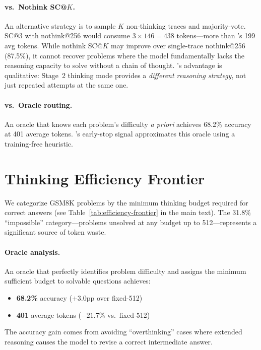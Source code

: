 \paragraph{vs.\ Nothink SC@$K$.}
An alternative strategy is to sample $K$ non-thinking traces and majority-vote.
SC@3 with nothink@256 would consume $3 \times 146 = 438$ tokens---more than
\method{}'s 199 avg tokens.
While nothink SC@$K$ may improve over single-trace nothink@256 (87.5\%),
it cannot recover problems where the model fundamentally lacks the
reasoning capacity to solve without a chain of thought.
\method{}'s advantage is qualitative: Stage~2 thinking mode provides a
\emph{different reasoning strategy}, not just repeated attempts at the same one.

\paragraph{vs.\ Oracle routing.}
An oracle that knows each problem's difficulty \emph{a priori}
achieves 68.2\% accuracy at 401 average tokens.
\method{}'s early-stop signal approximates this oracle using a training-free heuristic.

\section{Thinking Efficiency Frontier}
\label{app:frontier}

We categorize GSM8K problems by the minimum thinking budget required
for correct answers (see Table~\ref{tab:efficiency-frontier} in the
main text).
The 31.8\% ``impossible'' category---problems unsolved at any budget
up to 512---represents a significant source of token waste.

\paragraph{Oracle analysis.}
An oracle that perfectly identifies problem difficulty and assigns
the minimum sufficient budget to solvable questions achieves:
\begin{itemize}[nosep,leftmargin=*]
    \item \textbf{68.2\%} accuracy ($+3.0$pp over fixed-512)
    \item \textbf{401} average tokens ($-21.7$\% vs.\ fixed-512)
\end{itemize}
The accuracy gain comes from avoiding ``overthinking'' cases where
extended reasoning causes the model to revise a correct intermediate
answer.

